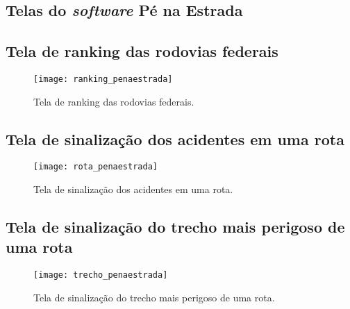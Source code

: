 \begin{anexosenv}

\partanexos

\chapter{Telas do \textit{software} Pé na Estrada}
  
  \section{Tela de ranking das rodovias federais}
    \begin{figure}[!htb]
      \centering
      \texttt{[image: ranking\_penaestrada]}
      \caption[Tela de ranking das rodovias federais]{Tela de ranking das rodovias federais.}
      \label{fig:ranking_penaestrada}
    \end{figure}
    
    \vfill
  
  \pagebreak
  \section{Tela de sinalização dos acidentes em uma rota}
    \begin{figure}[!htb]
      \centering
      \texttt{[image: rota\_penaestrada]}
      \caption[Tela de sinalização dos acidentes em uma rota]{Tela de sinalização dos acidentes em uma rota.}
      \label{fig:rota_penaestrada}
    \end{figure}
    
    \vfill
    
  \pagebreak
  \section{Tela de sinalização do trecho mais perigoso de uma rota}
  
    \begin{figure}[!htb]
      \centering
      \texttt{[image: trecho\_penaestrada]}
      \caption[Tela de sinalização do trecho mais perigoso de uma rota]{Tela de sinalização do trecho mais perigoso de uma rota.}
      \label{fig:trecho_penaestrada}
    \end{figure}
    
    \vfill
    
\end{anexosenv}

